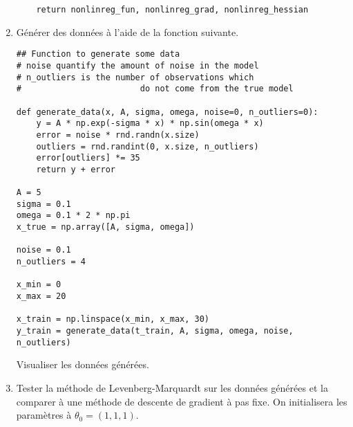 \documentclass[a4paper,french,12pt]{article}
\begin{document}
\begin{enumerate}
\begin{lstlisting}
    return nonlinreg_fun, nonlinreg_grad, nonlinreg_hessian  
  \end{lstlisting}
\item Générer des données à l'aide de la fonction suivante.
\begin{lstlisting}
## Function to generate some data    
# noise quantify the amount of noise in the model
# n_outliers is the number of observations which 
#                        do not come from the true model

def generate_data(x, A, sigma, omega, noise=0, n_outliers=0):
    y = A * np.exp(-sigma * x) * np.sin(omega * x)
    error = noise * rnd.randn(x.size)
    outliers = rnd.randint(0, x.size, n_outliers)
    error[outliers] *= 35
    return y + error
    
A = 5
sigma = 0.1
omega = 0.1 * 2 * np.pi
x_true = np.array([A, sigma, omega])

noise = 0.1
n_outliers = 4

x_min = 0
x_max = 20

x_train = np.linspace(x_min, x_max, 30)
y_train = generate_data(t_train, A, sigma, omega, noise, n_outliers)
  \end{lstlisting}
Visualiser les données générées.
\item Tester la méthode de Levenberg-Marquardt sur les données générées et la comparer à une méthode de descente de gradient à pas fixe. On initialisera les paramètres à $\theta_{0} = (1,1,1)$. %
\end{enumerate}



\end{document}
